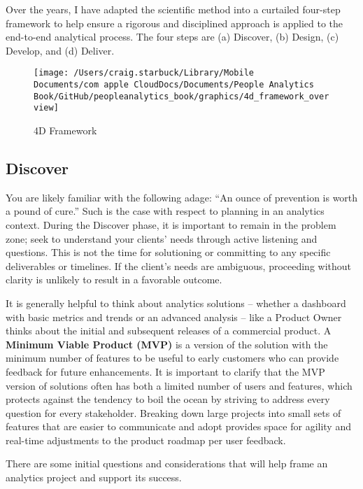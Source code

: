 \documentclass[
]{book}
\begin{document}
Over the years, I have adapted the scientific method into a curtailed four-step framework to help ensure a rigorous and disciplined approach is applied to the end-to-end analytical process. The four steps are (a) Discover, (b) Design, (c) Develop, and (d) Deliver.

\begin{figure}

{\centering \texttt{[image: /Users/craig.starbuck/Library/Mobile Documents/com~apple~CloudDocs/Documents/People Analytics Book/GitHub/peopleanalytics\_book/graphics/4d\_framework\_overview]} 

}

\caption{4D Framework}\label{fig:4d-framework}
\end{figure}

\hypertarget{discover}{%
\subsection{Discover}\label{discover}}

You are likely familiar with the following adage: ``An ounce of prevention is worth a pound of cure.'' Such is the case with respect to planning in an analytics context. During the Discover phase, it is important to remain in the problem zone; seek to understand your clients' needs through active listening and questions. This is not the time for solutioning or committing to any specific deliverables or timelines. If the client's needs are ambiguous, proceeding without clarity is unlikely to result in a favorable outcome.

It is generally helpful to think about analytics solutions -- whether a dashboard with basic metrics and trends or an advanced analysis -- like a Product Owner thinks about the initial and subsequent releases of a commercial product. A \textbf{Minimum Viable Product (MVP)} is a version of the solution with the minimum number of features to be useful to early customers who can provide feedback for future enhancements. It is important to clarify that the MVP version of solutions often has both a limited number of users and features, which protects against the tendency to boil the ocean by striving to address every question for every stakeholder. Breaking down large projects into small sets of features that are easier to communicate and adopt provides space for agility and real-time adjustments to the product roadmap per user feedback.

There are some initial questions and considerations that will help frame an analytics project and support its success.
\end{document}
